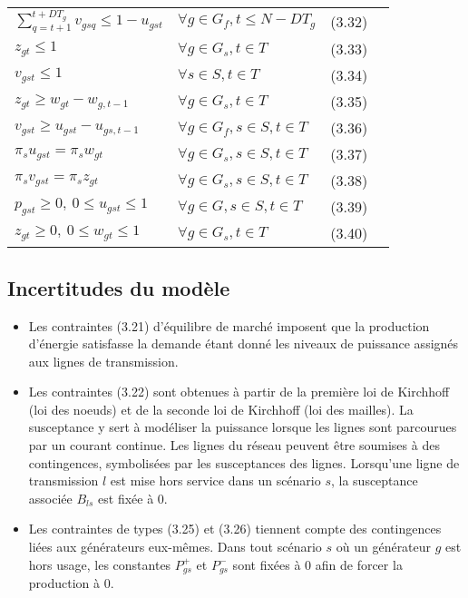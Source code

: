 \begin{tabularx}{\textwidth}{l X r r}
$\sum\limits_{q=t+1}^{t+DT_g} v_{gsq} \le 1 - u_{gst}$ & $\forall g \in G_f, t \le N - DT_g$ & (3.32) \\
$z_{gt} \le 1$ & $\forall g \in G_s, t \in T$ & (3.33) \\
$v_{gst} \le 1$ & $\forall s \in S, t \in T$ & (3.34) \\
$z_{gt} \ge w_{gt} - w_{g,t-1}$ & $\forall g \in G_s, t \in T$ & (3.35) \\
$v_{gst} \ge u_{gst} - u_{gs,t-1}$ & $\forall g \in G_f, s \in S, t \in T$ & (3.36) \\
$\pi_s u_{gst} = \pi_s w_{gt}$ & $\forall g \in G_s, s \in S, t \in T$ & (3.37) \\
$\pi_s v_{gst} = \pi_s z_{gt}$ & $\forall g \in G_s, s \in S, t \in T$ & (3.38) \\
$p_{gst} \ge 0, \ 0 \le u_{gst} \le 1$ & $\forall g \in G, s \in S, t \in T$ & (3.39) \\
$z_{gt} \ge 0, \ 0 \le w_{gt} \le 1$ & $\forall g \in G_s, t \in T$ & (3.40) \\
\end{tabularx}

\vspace{2cm}

\subsection{Incertitudes du modèle}

\begin{itemize}
    \item Les contraintes (3.21) d'équilibre de marché imposent que la production d'énergie satisfasse la demande étant donné les niveaux de puissance
    assignés aux lignes de transmission.
    \item Les contraintes (3.22) sont obtenues à partir de la première loi de Kirchhoff (loi des noeuds) et de la seconde loi de Kirchhoff
    (loi des mailles). La susceptance y sert à modéliser la puissance lorsque les lignes sont parcourues par un courant continue.
    Les lignes du réseau peuvent être soumises à des contingences, symbolisées par les susceptances des lignes.
    Lorsqu'une ligne de transmission $l$ est mise hors service dans un scénario $s$, la susceptance associée $B_{ls}$ est fixée à 0.
    \item Les contraintes de types (3.25) et (3.26) tiennent compte des contingences liées aux générateurs eux-mêmes.
    Dans tout scénario $s$ où un générateur $g$ est hors usage, les constantes $P_{gs}^{+}$ et $P_{gs}^{-}$ sont fixées à 0 afin de forcer
    la production à 0.
\end{itemize}

